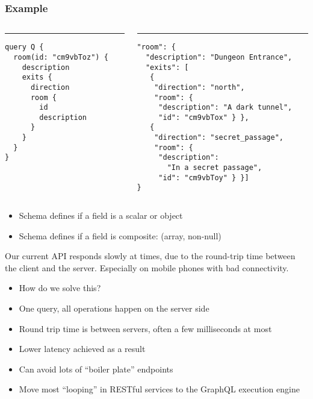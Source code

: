 \documentclass[lualatex]{beamer}
\begin{document}
\begin{frame}[fragile]
  \frametitle{Example}
\begin{columns}[T] %
\begin{column}{.5\textwidth}
\color{black}\rule{\linewidth}{1pt}
\begin{verbatim}
query Q {
  room(id: "cm9vbToz") {
    description
    exits {
      direction
      room {
        id
        description
      }
    }
  }
}
\end{verbatim}
\end{column}
\hfill
\begin{column}{.5\textwidth}
\color{gray}\rule{\linewidth}{1pt}
\begin{verbatim}
"room": {
  "description": "Dungeon Entrance",
  "exits": [
   {
    "direction": "north",
    "room": {
     "description": "A dark tunnel",
     "id": "cm9vbTox" } },
   {
    "direction": "secret_passage",
    "room": {
     "description":
       "In a secret passage",
     "id": "cm9vbToy" } }]
}
\end{verbatim}
\end{column}
\end{columns}
\begin{itemize}
\item Schema defines if a field is a scalar or object
\item Schema defines if a field is composite: (array, non-null)
\end{itemize}
\end{frame}

\begin{frame}
  Our current API responds slowly at times, due to the round-trip
  time between the client and the server. Especially on mobile phones
  with bad connectivity.
  
  \begin{itemize}
  \item How do we solve this?
  \end{itemize}
\end{frame}

\begin{frame}
  \begin{itemize}
  \item One query, all operations happen on the server side
  \item Round trip time is between servers, often a few milliseconds
    at most
  \item Lower latency achieved as a result
  \item Can avoid lots of ``boiler plate'' endpoints
  \item Move most ``looping'' in RESTful services to the GraphQL
    execution engine
  \end{itemize}
\end{frame}
\end{document}
